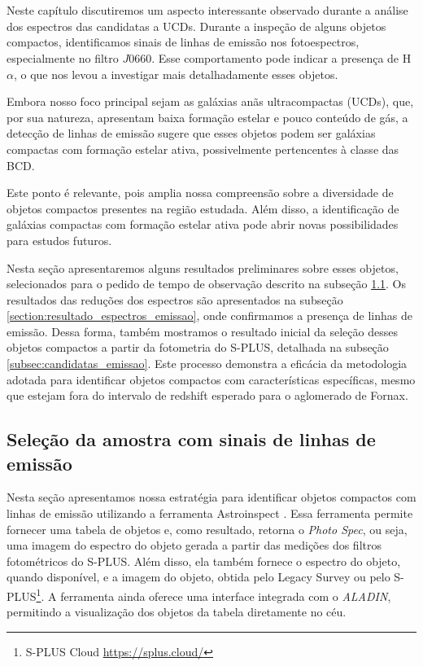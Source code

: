 \chapter{\chapternamespectraemission}\label{chap:spectra_emission}

Neste capítulo discutiremos um aspecto interessante observado durante a análise dos espectros das candidatas a UCDs. Durante a inspeção de alguns objetos compactos, identificamos sinais de linhas de emissão nos fotoespectros, especialmente no filtro $J0660$. Esse comportamento pode indicar a presença de H$\alpha$, o que nos levou a investigar mais detalhadamente esses objetos. 

Embora nosso foco principal sejam as galáxias anãs ultracompactas (UCDs), que, por sua natureza, apresentam baixa formação estelar e pouco conteúdo de gás, a detecção de linhas de emissão sugere que esses objetos podem ser galáxias compactas com formação estelar ativa, possivelmente pertencentes à classe das \ac{BCD}. 

Este ponto é relevante, pois amplia nossa compreensão sobre a diversidade de objetos compactos presentes na região estudada. Além disso, a identificação de galáxias compactas com formação estelar ativa pode abrir novas possibilidades para estudos futuros.

Nesta seção apresentaremos alguns resultados preliminares sobre esses objetos, selecionados para o pedido de tempo de observação descrito na subseção \ref{section:candidatas_emissao}. Os resultados das reduções dos espectros são apresentados na subseção \ref{section:resultado_espectros_emissao}, onde confirmamos a presença de linhas de emissão. Dessa forma, também mostramos o resultado inicial da seleção desses objetos compactos a partir da fotometria do S-PLUS, detalhada na subseção \ref{subsec:candidatas_emissao}. Este processo demonstra a eficácia da metodologia adotada para identificar objetos compactos com características específicas, mesmo que estejam fora do intervalo de redshift esperado para o aglomerado de Fornax.

\section{Seleção da amostra com sinais de linhas de emissão}\label{section:candidatas_emissao}

Nesta seção apresentamos nossa estratégia para identificar objetos compactos com linhas de emissão utilizando a ferramenta Astroinspect \citep{astroinspect}. Essa ferramenta permite fornecer uma tabela de objetos e, como resultado, retorna o \textit{Photo Spec}, ou seja, uma imagem do espectro do objeto gerada a partir das medições dos filtros fotométricos do S-PLUS. Além disso, ela também fornece o espectro do objeto, quando disponível, e a imagem do objeto, obtida pelo Legacy Survey ou pelo S-PLUS\footnote{S-PLUS Cloud \url{https://splus.cloud/}}. A ferramenta ainda oferece uma interface integrada com o \textit{ALADIN}, permitindo a visualização dos objetos da tabela diretamente no céu.

